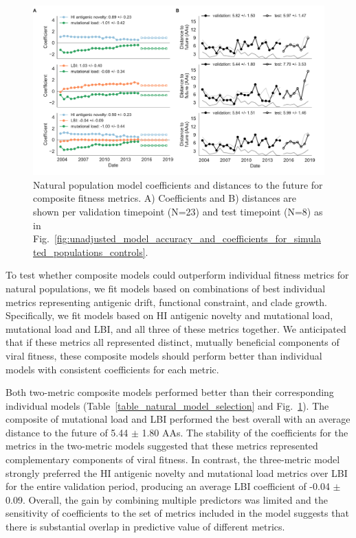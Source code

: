 \begin{figure}[htb]
  \begin{center}
  \includegraphics[width=\textwidth]{figures/best-composite-unadjusted-model-accuracy-and-coefficients-for-natural-populations.pdf}
  \caption{
    Natural population model coefficients and distances to the future for composite fitness metrics.
    A) Coefficients and B) distances are shown per validation timepoint (N=23) and test timepoint (N=8) as in Fig.~\ref{fig:unadjusted_model_accuracy_and_coefficients_for_simulated_populations_controls}.
  }
  \label{fig:unadjusted_composite_model_accuracy_and_coefficients_for_natural_populations}
  \end{center}
\end{figure}

To test whether composite models could outperform individual fitness metrics for natural populations, we fit models based on combinations of best individual metrics representing antigenic drift, functional constraint, and clade growth.
Specifically, we fit models based on HI antigenic novelty and mutational load, mutational load and LBI, and all three of these metrics together.
We anticipated that if these metrics all represented distinct, mutually beneficial components of viral fitness, these composite models should perform better than individual models with consistent coefficients for each metric.

Both two-metric composite models performed better than their corresponding individual models (Table~\ref{table_natural_model_selection} and Fig.~\ref{fig:unadjusted_composite_model_accuracy_and_coefficients_for_natural_populations}).
The composite of mutational load and LBI performed the best overall with an average distance to the future of 5.44 $\pm$ 1.80 AAs.
The stability of the coefficients for the metrics in the two-metric models suggested that these metrics represented complementary components of viral fitness.
In contrast, the three-metric model strongly preferred the HI antigenic novelty and mutational load metrics over LBI for the entire validation period, producing an average LBI coefficient of -0.04 $\pm$ 0.09.
Overall, the gain by combining multiple predictors was limited and the sensitivity of coefficients to the set of metrics included in the model suggests that there is substantial overlap in predictive value of different metrics.

